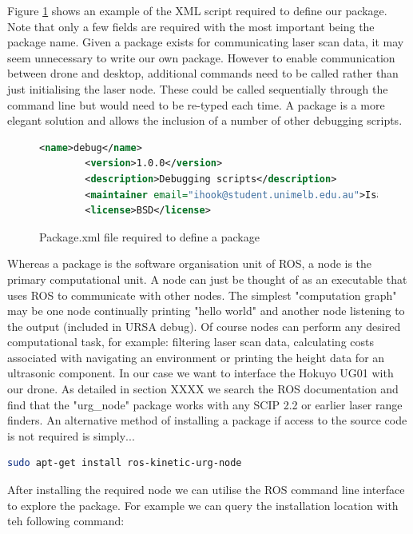 \documentclass[capstone_report.tex]{subfiles}
\begin{document}
 Figure \ref{fig:package_xml} shows an example of the XML script required to define our package.  Note that only a few fields are required with the most important being the package name. Given a package exists for communicating laser scan data, it may seem unnecessary to write our own package.  However to enable communication between drone and desktop, additional commands need to be called rather than just initialising the laser node.  These could be called sequentially through the command line but would need to be re-typed each time.  A package is a more elegant solution and allows the inclusion of a number of other debugging scripts.

 \begin{figure}[H]
    \begin{lstlisting}[language=xml]
        <name>debug</name>
        <version>1.0.0</version>
        <description>Debugging scripts</description>
        <maintainer email="ihook@student.unimelb.edu.au">Isaac Hook</maintainer>
        <license>BSD</license>
    \end{lstlisting}
    \caption{Package.xml file required to define a package}\label{fig:package_xml}
\end{figure}

Whereas a package is the software organisation unit of ROS, a node is the primary computational unit.  A node can just be thought of as an executable that uses ROS to communicate with other nodes.  The simplest "computation graph" may be one node continually printing "hello world" and another node listening to the output (included in URSA debug).  Of course nodes can perform any desired computational task, for example: filtering laser scan data, calculating costs associated with navigating an environment or printing the height data for an ultrasonic component.  In our case we want to interface the Hokuyo UG01 with our drone.  As detailed in section XXXX we search the ROS documentation and find that the "urg\_node" package works with any SCIP 2.2 or earlier laser range finders.  An alternative method of installing a package if access to the source code is not required is simply$...$

\begin{lstlisting}[language=bash]
    sudo apt-get install ros-kinetic-urg-node
\end{lstlisting}

After installing the required node we can utilise the ROS command line interface to explore the package.  For example we can query the installation location with teh following command:
\end{document}
